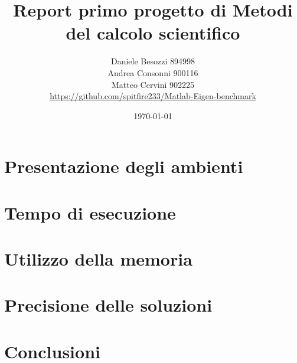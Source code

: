 \documentclass{report}
\title{Report primo progetto di Metodi del calcolo scientifico}
\author{
Daniele Besozzi 894998 \\
Andrea Consonni 900116 \\
Matteo Cervini 902225 \\
\url{https://github.com/spitfire233/Matlab-Eigen-benchmark}
}
\date{\today}
\begin{document}
\maketitle

\tableofcontents
\chapter{Presentazione degli ambienti}

\chapter{Tempo di esecuzione}

\chapter{Utilizzo della memoria}

\chapter{Precisione delle soluzioni}

\chapter{Conclusioni}


\printbibliography
\end{document}
